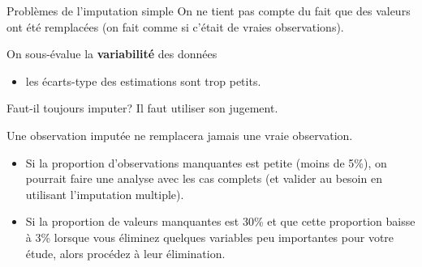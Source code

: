 \documentclass[
  ignorenonframetext,
]{beamer}
\providecommand{\tightlist}{%
  \setlength{\itemsep}{0pt}\setlength{\parskip}{0pt}}\usepackage{longtable,booktabs,array}
\begin{document}
\begin{frame}{Problèmes de l'imputation simple}
\protect\hypertarget{probluxe8mes-de-limputation-simple}{}
On ne tient pas compte du fait que des valeurs ont été remplacées (on
fait comme si c'était de vraies observations).

On sous-évalue la \textbf{variabilité} des données

\begin{itemize}
\tightlist
\item
  les écarts-type des estimations sont trop petits.
\end{itemize}
\end{frame}

\begin{frame}{Faut-il toujours imputer?}
\protect\hypertarget{faut-il-toujours-imputer}{}
Il faut utiliser son jugement.

Une observation imputée ne remplacera jamais une vraie observation.

\begin{itemize}
\tightlist
\item
  Si la proportion d'observations manquantes est petite (moins de 5\%),
  on pourrait faire une analyse avec les cas complets (et valider au
  besoin en utilisant l'imputation multiple).
\item
  Si la proportion de valeurs manquantes est 30\% et que cette
  proportion baisse à 3\% lorsque vous éliminez quelques variables peu
  importantes pour votre étude, alors procédez à leur élimination.
\end{itemize}
\end{frame}
\end{document}
